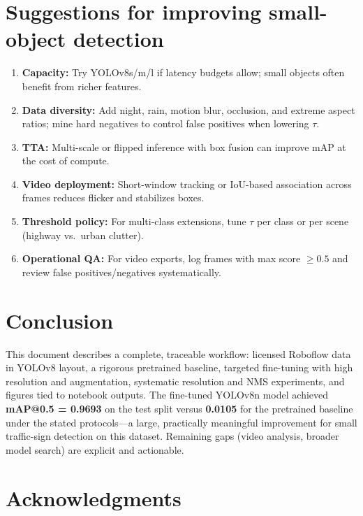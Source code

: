 \documentclass[11pt,a4paper]{article}
\begin{document}
\section{Suggestions for improving small-object detection}
\label{sec:suggestions}

\begin{enumerate}[leftmargin=*]
  \item \textbf{Capacity:} Try YOLOv8s/m/l if latency budgets allow; small objects often benefit from richer features.
  \item \textbf{Data diversity:} Add night, rain, motion blur, occlusion, and extreme aspect ratios; mine hard negatives to control false positives when lowering $\tau$.
  \item \textbf{TTA:} Multi-scale or flipped inference with box fusion can improve mAP at the cost of compute.
  \item \textbf{Video deployment:} Short-window tracking or IoU-based association across frames reduces flicker and stabilizes boxes.
  \item \textbf{Threshold policy:} For multi-class extensions, tune $\tau$ per class or per scene (highway vs.\ urban clutter).
  \item \textbf{Operational QA:} For video exports, log frames with max score $\geq \num{0.5}$ and review false positives/negatives systematically.
\end{enumerate}

\section{Conclusion}

This document describes a complete, traceable workflow: licensed Roboflow data in YOLOv8 layout, a rigorous pretrained baseline, targeted fine-tuning with high resolution and augmentation, systematic resolution and NMS experiments, and figures tied to notebook outputs. The fine-tuned YOLOv8n model achieved \textbf{mAP@0.5 = \num{0.9693}} on the test split versus \textbf{\num{0.0105}} for the pretrained baseline under the stated protocols---a large, practically meaningful improvement for small traffic-sign detection on this dataset. Remaining gaps (video analysis, broader model search) are explicit and actionable.

\section*{Acknowledgments}
\end{document}
